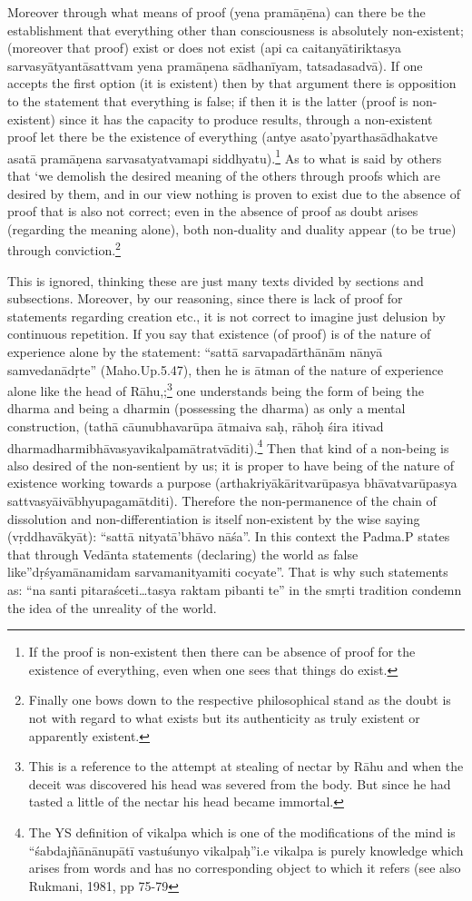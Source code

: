 Moreover through what means of proof (yena pramāṇēna) can there be the establishment that everything other than consciousness is absolutely non-existent; (moreover that proof) exist or does not exist (api ca caitanyātiriktasya sarvasyātyantāsattvam yena pramāṇena sādhanīyam, tatsadasadvā). If one accepts the first option (it is existent) then by that argument there is opposition to the statement that everything is false; if then it is the latter (proof is non-existent) since it has the capacity to produce results, through a non-existent proof let there be the existence of everything (antye asato’pyarthasādhakatve asatā pramāṇena sarvasatyatvamapi siddhyatu).\footnote{If the proof is non-existent then there can be absence of proof for the existence of everything, even when one sees that things do exist.} As to what is said by others that ‘we demolish the desired meaning of the others through proofs which are desired by them, and in our view nothing is proven to exist due to the absence of proof that is also not correct; even in the absence of proof as doubt arises (regarding the meaning alone), both non-duality and duality appear (to be true) through conviction.\footnote{Finally one bows down to the respective philosophical stand as the doubt is not with regard to what exists but its authenticity as truly existent or apparently existent.} 

This is ignored, thinking these are just many texts divided by sections and subsections.  Moreover, by our reasoning, since there is lack of proof for statements regarding creation etc., it is not correct to imagine just delusion by continuous repetition. If you say that existence (of proof) is of the nature of experience alone by the statement: “sattā sarvapadārthānām nānyā samvedanādṛte” (Maho.Up.5.47), then he is ātman of the nature of experience alone like the head of Rāhu,;\footnote{This is a reference to the attempt at stealing of nectar by Rāhu and when the deceit was discovered his head was severed from the body. But since he had tasted a little of the nectar his head became immortal.} one understands being the form of being the dharma and being a dharmin (possessing the dharma) as only a mental construction, (tathā cāunubhavarūpa ātmaiva saḥ, rāhoḥ śira itivad dharmadharmibhāvasya\break vikalpamātratvāditi).\footnote{The YS definition of vikalpa which is one of the modifications of the mind is “śabdajñānānupātī vastuśunyo vikalpaḥ”i.e vikalpa is purely knowledge which arises from words and has no corresponding object to which it refers (see also Rukmani, 1981, pp 75-79} Then that kind of a non-being is also desired of the non-sentient by us;   it is proper to have being of the nature of existence working towards a purpose (arthakriyākāritvarūpasya bhāvatvarūpasya sattvasyāivābhyupagamātditi). Therefore the non-perma\-nence of the chain of dissolution and non-differentiation is itself non-existent by the wise saying (vṛddhavākyāt): “sattā nityatā’bhāvo nāśa”. In this context the Padma.P states that through Vedānta statements (declaring) the world as false like”dṛśyamānamidam sarvamanityamiti cocyate”. That is why such statements as: “na santi pitaraśceti…tasya raktam pibanti te” in the smṛti tradition condemn the idea of the unreality of the world.

